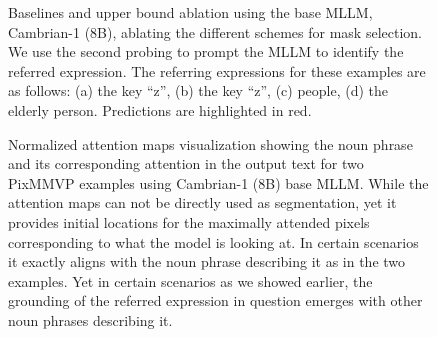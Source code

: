 \begin{figure}[t]
\caption{Baselines and upper bound ablation using the base MLLM, Cambrian-1 (8B), ablating the different schemes for mask selection. We use the second probing to prompt the MLLM to identify the referred expression. The referring expressions for these examples are as follows: (a) the key ``z'', (b) the key ``z'', (c) people, (d) the elderly person. Predictions are highlighted in red.} 
\label{fig:appablation}
\end{figure}

\begin{figure}[t]
\centering

\begin{subfigure}{0.16\textwidth}
\end{subfigure}%
\begin{subfigure}{0.16\textwidth}
\end{subfigure}%
\begin{subfigure}{0.16\textwidth}
\end{subfigure}

\begin{subfigure}{0.16\textwidth}
\end{subfigure}%
\begin{subfigure}{0.16\textwidth}
\end{subfigure}%
\begin{subfigure}{0.16\textwidth}
\end{subfigure}
\caption{Normalized attention maps visualization showing the noun phrase and its corresponding attention in the output text for two PixMMVP examples using Cambrian-1 (8B) base MLLM. While the attention maps can not be directly used as segmentation, yet it provides initial locations for the maximally attended pixels corresponding to what the model is looking at. In certain scenarios it exactly aligns with the noun phrase describing it as in the two examples. Yet in certain scenarios as we showed earlier, the grounding of the referred expression in question emerges with other noun phrases describing it.}
\label{fig:attmaps}
\end{figure}

